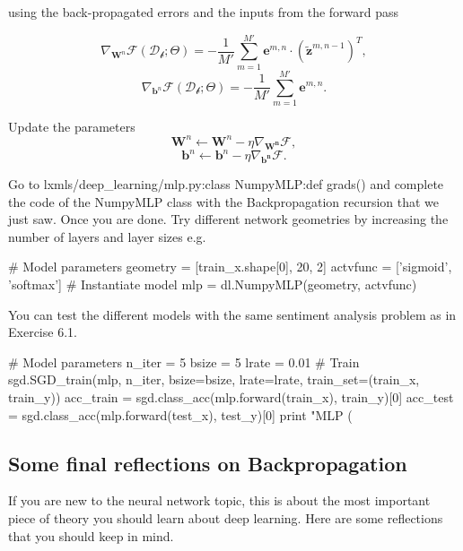 \begin{algorithm}[th!]
\begin{algorithmic}[1]
		\vspace{0.3cm}
         using the back-propagated errors and the inputs from the forward pass

        $$\nabla_{\mathbf{W}^n}\mathcal{F}(\mathcal{D_b};\Theta)  = -\frac{1}{M'} \sum_{m=1}^{M'} \mathbf{e}^{m,n} \cdot \left(\tilde{\mathbf{z}}^{m,n-1}\right)^T,$$ 
        $$\nabla_{\mathbf{b}^n}\mathcal{F}(\mathcal{D_b};\Theta)  = - \frac{1}{M'} \sum_{m=1}^{M'} \mathbf{e}^{m,n}.$$  

		\vspace{0.3cm}
        \STATE Update the parameters 
            $$\mathbf{W}^n \leftarrow \mathbf{W}^n - \eta \nabla_\mathbf{W^n}\mathcal{F},$$ 
            $$\mathbf{b}^n \leftarrow \mathbf{b}^n - \eta \nabla_\mathbf{b^n}\mathcal{F}.$$ 

	\ENDFOR

	\ENDFOR
	\ENDFOR
\end{algorithmic}
\end{algorithm}

\begin{exercise}
Go to lxmls/deep\_learning/mlp.py:class NumpyMLP:def grads() and complete the
code of the NumpyMLP class with the Backpropagation recursion that we just saw.
Once you are done. Try different network geometries by increasing the number of
layers and layer sizes e.g.
\begin{python}
# Model parameters
geometry = [train_x.shape[0], 20, 2]
actvfunc = ['sigmoid', 'softmax'] 
# Instantiate model
mlp      = dl.NumpyMLP(geometry, actvfunc) 
\end{python}
You can test the different models with the same sentiment analysis problem as
in Exercise 6.1. 
\begin{python}
# Model parameters
n_iter = 5
bsize  = 5
lrate  = 0.01
# Train
sgd.SGD_train(mlp, n_iter, bsize=bsize, lrate=lrate, train_set=(train_x, train_y))
acc_train = sgd.class_acc(mlp.forward(train_x), train_y)[0]
acc_test  = sgd.class_acc(mlp.forward(test_x), test_y)[0]
print "MLP (%
\end{python}
\end{exercise}

\subsection{Some final reflections on Backpropagation}

If you are new to the neural network topic, this is about the most important
piece of theory you should learn about deep learning. Here are some reflections
that you should keep in mind.

